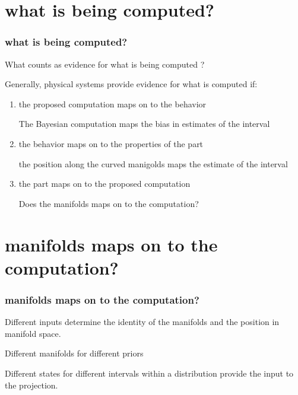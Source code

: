\documentclass{beamer}
\begin{document}

\section{what is being computed?}
\begin{frame}
\frametitle{\textbf{what is being computed?} }
What counts as evidence for what is being computed ?

Generally, physical systems provide evidence for what is computed if:

\begin{enumerate}
    \item the proposed computation maps on to the behavior
    
    The Bayesian computation maps the bias in estimates of the interval

    \item the behavior maps on to the properties of the part
    
    the position along the curved manigolds maps the estimate of the interval

    \item the part maps on to the proposed computation
    
    Does the manifolds maps on to the computation?
\end{enumerate}

\end{frame}


\section{manifolds maps on to the computation?}
\begin{frame}
\frametitle{\textbf{manifolds maps on to the computation?} }
Different inputs determine the identity of the manifolds and the position in manifold space.


Different manifolds for different priors

Different states for different intervals within a distribution provide the input to the projection.

\end{frame}
\end{document}
